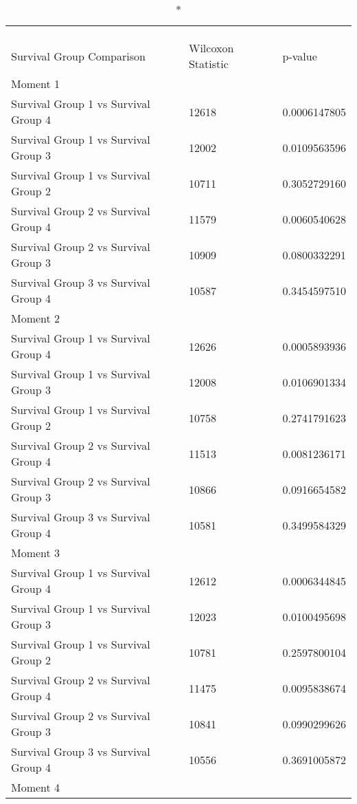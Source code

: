 \captionsetup[table]{labelformat=empty,skip=1pt}
\begin{longtable}{lll}
\caption*{
\large Survival Group Feature Curve
Moment Statistical Comparison\\ 
\small \\ 
} \\ 
\toprule
Survival Group Comparison & Wilcoxon Statistic & p-value \\ 
\midrule
\multicolumn{1}{l}{Moment 1} \\ 
\midrule
Survival Group 1 vs Survival Group 4 & 12618 & 0.0006147805 \\ 
Survival Group 1 vs Survival Group 3 & 12002 & 0.0109563596 \\ 
Survival Group 1 vs Survival Group 2 & 10711 & 0.3052729160 \\ 
Survival Group 2 vs Survival Group 4 & 11579 & 0.0060540628 \\ 
Survival Group 2 vs Survival Group 3 & 10909 & 0.0800332291 \\ 
Survival Group 3 vs Survival Group 4 & 10587 & 0.3454597510 \\ 
\midrule
\multicolumn{1}{l}{Moment 2} \\ 
\midrule
Survival Group 1 vs Survival Group 4 & 12626 & 0.0005893936 \\ 
Survival Group 1 vs Survival Group 3 & 12008 & 0.0106901334 \\ 
Survival Group 1 vs Survival Group 2 & 10758 & 0.2741791623 \\ 
Survival Group 2 vs Survival Group 4 & 11513 & 0.0081236171 \\ 
Survival Group 2 vs Survival Group 3 & 10866 & 0.0916654582 \\ 
Survival Group 3 vs Survival Group 4 & 10581 & 0.3499584329 \\ 
\midrule
\multicolumn{1}{l}{Moment 3} \\ 
\midrule
Survival Group 1 vs Survival Group 4 & 12612 & 0.0006344845 \\ 
Survival Group 1 vs Survival Group 3 & 12023 & 0.0100495698 \\ 
Survival Group 1 vs Survival Group 2 & 10781 & 0.2597800104 \\ 
Survival Group 2 vs Survival Group 4 & 11475 & 0.0095838674 \\ 
Survival Group 2 vs Survival Group 3 & 10841 & 0.0990299626 \\ 
Survival Group 3 vs Survival Group 4 & 10556 & 0.3691005872 \\ 
\midrule
\multicolumn{1}{l}{Moment 4} \\ 

\end{longtable}
